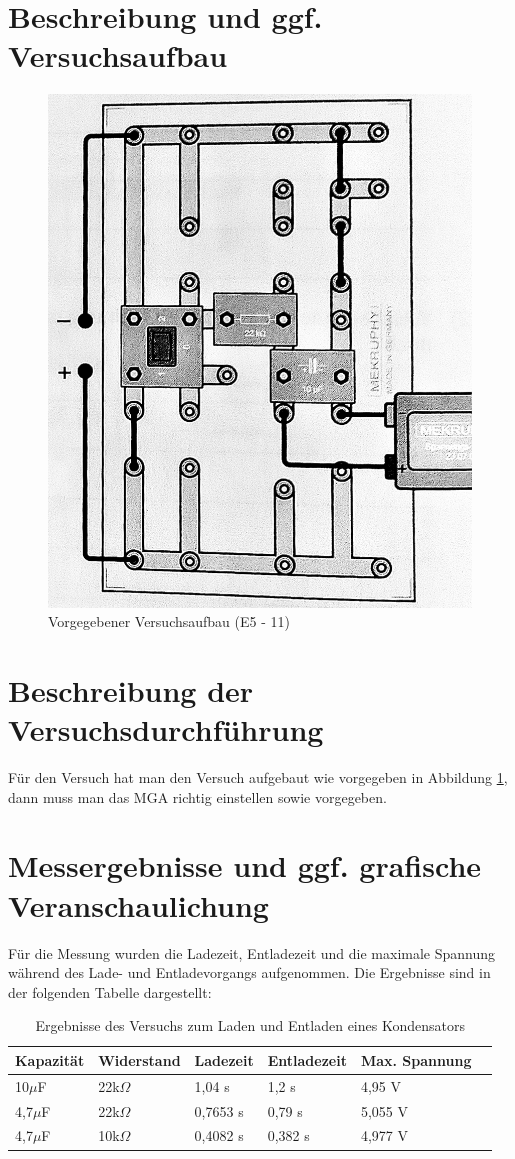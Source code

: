 \documentclass{article}
\begin{document}
\section{Beschreibung und ggf. Versuchsaufbau}

\begin{figure}[!htb]
    \centering
    \includegraphics[width=.2\textwidth]{aufbau.jpg}
    \caption{Vorgegebener Versuchsaufbau (E5 - 11)}
    \label{fig:versuchsaufbau}
\end{figure}


\section{Beschreibung der Versuchsdurchführung}
Für den Versuch hat man den Versuch aufgebaut wie vorgegeben in Abbildung
\ref{fig:versuchsaufbau}, dann muss man das MGA richtig einstellen sowie
vorgegeben.




\section{Messergebnisse und ggf. grafische Veranschaulichung}

Für die Messung wurden die Ladezeit, Entladezeit und die maximale Spannung
während des Lade- und Entladevorgangs aufgenommen. Die Ergebnisse sind in der
folgenden Tabelle dargestellt:

\begin{table}[!htb]
\centering
\caption{Ergebnisse des Versuchs zum Laden und Entladen eines Kondensators}
\label{tab:KondensatorErgebnisse}
\begin{tabular}{@{}llllll@{}}
\toprule
Kapazität & Widerstand & Ladezeit & Entladezeit & Max. Spannung\\
\midrule
10$\mu$F & 22k$\Omega$ & 1,04 s & 1,2 s & 4,95 V &\\
4,7$\mu$F & 22k$\Omega$ & 0,7653 s & 0,79 s & 5,055 V\\
4,7$\mu$F & 10k$\Omega$ & 0,4082 s & 0,382 s & 4,977 V\\
\bottomrule
\end{tabular}
\end{table}
\end{document}
